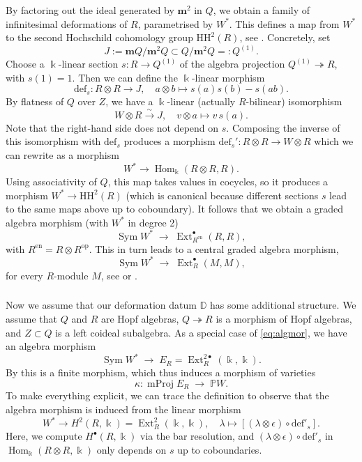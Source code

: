 \documentclass{amsart}
\numberwithin{equation}{section}
\theoremstyle{definition}
\theoremstyle{remark}
\newcommand{\Sym}{\operatorname{Sym}}
\newcommand{\bk}{\Bbbk}
\newcommand{\Hom}{\operatorname{Hom}}
\newcommand{\tto}{\twoheadrightarrow}
\newcommand{\Ext}{\operatorname{Ext}}
\newcommand{\mProj}{\operatorname{mProj}}
\newcommand{\fm}{\mathbf{m}}
\newcommand{\mD}{\mathbb{D}}
\newcommand{\mP}{\mathbb{P}}
\begin{document}
\subsubsection{}\label{sec:HH} By factoring out the ideal generated by $\fm^2$ in $Q$, we obtain a family of infinitesimal deformations of $R$, parametrised by $W^\ast$. This defines a map from $W^\ast$ to the second Hochschild cohomology group $\mathrm{HH}^2(R)$, see \cite{Ge}. Concretely, set 
\[J:=\fm Q/\fm^2 Q\subset Q/\fm^2 Q=:Q^{(1)}.\]
Choose a $\bk$-linear section $s:R\to Q^{(1)}$ of the algebra projection $Q^{(1)}\tto R$, with $s(1)=1$. Then we can define the $\bk$-linear morphism
\[\mathrm{def}_s: R\otimes R\to J,\quad a\otimes b\mapsto s(a)s(b)-s(ab).\]
By flatness of $Q$ over $Z$, we have a $\bk$-linear (actually $R$-bilinear) isomorphism
\[W\otimes R\xrightarrow{\sim} J,\quad v\otimes a\mapsto v \,s(a).\]
Note that the right-hand side does not depend on $s$. Composing the inverse of this isomorphism with $\mathrm{def}_s$ produces  a morphism $\mathrm{def}_s':R\otimes R\to W\otimes R$ which we can rewrite as a morphism
\[W^\ast\to\Hom_{\bk}(R\otimes R,R).\]
Using associativity of $Q$, this map takes values in cocycles, so it produces a morphism $W^\ast\to\mathrm{HH}^2(R)$ (which is canonical because different sections $s$ lead to the same maps above up to coboundary). It follows that we obtain a graded algebra morphism (with $W^\ast$ in degree 2)
\begin{equation}\label{eq:WRen}\Sym W^\ast\;\to\; \Ext^\bullet_{R^{\mathrm{en}}}(R,R),\end{equation}
with $R^{\mathrm{en}}=R\otimes R^{\mathrm{op}}$. This in turn leads to a central graded algebra morphism,
\begin{equation}\label{eq:algmor}\Sym W^\ast\;\to\; \Ext^\bullet_{R}(M,M),\end{equation}
for every $R$-module $M$, see \cite[\S 3.4]{NP2} or \cite[\S 4.3]{Lo}.



\subsubsection{}\label{sec:DHopf}
Now we assume that our deformation datum $\mD$ has some additional structure. We assume that $Q$ and $R$ are Hopf algebras, $Q\tto R$ is a morphism of Hopf algebras, and $Z\subset Q$ is a left coideal subalgebra. As a special case of \eqref{eq:algmor}, we have an algebra morphism
\[\Sym W^\ast\;\to\; E_R=\Ext^{2\bullet}_R(\bk,\bk).\]
By \cite[Theorem~4.8]{NP2} this is a finite morphism, which thus induces a morphism of varieties
\[\kappa:\mProj E_R\;\to\; \mP W.\]
To make everything explicit, we can trace the definition to observe that the algebra morphism is induced from the linear morphism
\begin{equation}\label{eq:explWH}
W^\ast\to H^2(R,\bk)=\Ext^2_R(\bk,\bk),\quad \lambda\mapsto [(\lambda\otimes \epsilon)\circ \mathrm{def}'_s].
\end{equation}
Here, we compute $H^\bullet(R,\bk)$ via the bar resolution, and $(\lambda\otimes \epsilon)\circ \mathrm{def}'_s$ in $\Hom_{\bk}(R\otimes R,\bk)$ only depends on $s$ up to coboundaries.
\end{document}

